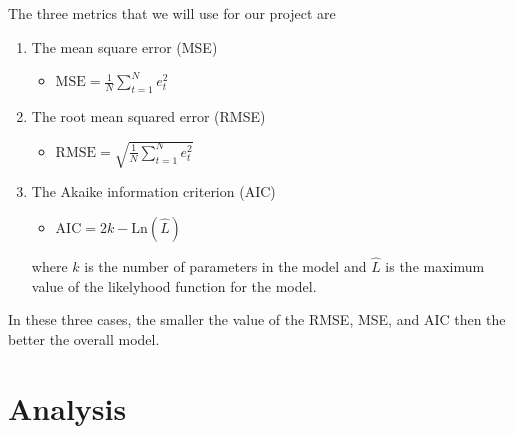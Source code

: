 \documentclass[10pt,a4paper]{article}
\begin{document}
 The three metrics that we will use for our project are
\begin{enumerate}

\item  The mean square error (MSE)
\begin{itemize}
\item $\text{MSE} = \frac{1}{N}\sum\limits_{t=1}^{N} e^2_{t} $
\end{itemize}

\item  The root mean squared error (RMSE)
\begin{itemize}
\item $\text{RMSE} = \sqrt{\frac{1}{N}\sum\limits_{t=1}^{N} e^2_{t}} $
\end{itemize}

\item The Akaike information criterion (AIC)
\begin{itemize}
\item $\text{AIC} = 2k - \text{Ln}(\hat{L})$
\end{itemize}
where $k$ is the number of parameters in the model and $\hat{L}$ is the maximum value of the likelyhood function for the model.

\end{enumerate}
\noindent
In these three cases, the smaller the value of the RMSE, MSE, and AIC then the better the overall model.


\newpage
\section{Analysis}
\end{document}
